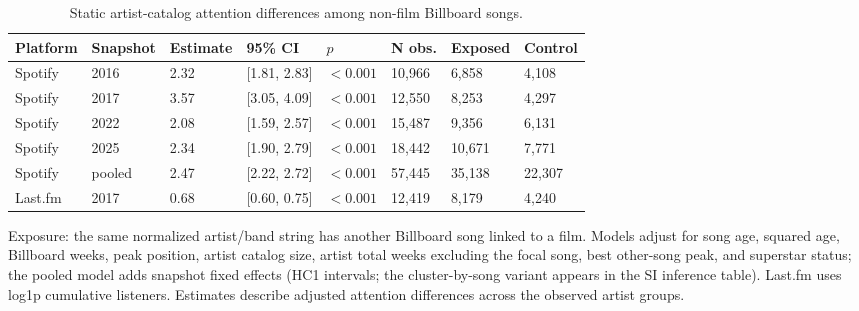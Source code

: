 \begin{table}[!htbp]
\centering
\footnotesize
\caption{Static artist-catalog attention differences among non-film Billboard songs.}
\label{tab:si-catalog-static}
\renewcommand{\arraystretch}{1.05}
\begin{tabular}{llllllll}
\toprule
Platform & Snapshot & Estimate & 95\% CI & $p$ & N obs. & Exposed & Control \\
\midrule
Spotify & 2016 & 2.32 & [1.81, 2.83] & $<0.001$ & 10,966 & 6,858 & 4,108 \\
Spotify & 2017 & 3.57 & [3.05, 4.09] & $<0.001$ & 12,550 & 8,253 & 4,297 \\
Spotify & 2022 & 2.08 & [1.59, 2.57] & $<0.001$ & 15,487 & 9,356 & 6,131 \\
Spotify & 2025 & 2.34 & [1.90, 2.79] & $<0.001$ & 18,442 & 10,671 & 7,771 \\
Spotify & pooled & 2.47 & [2.22, 2.72] & $<0.001$ & 57,445 & 35,138 & 22,307 \\
Last.fm & 2017 & 0.68 & [0.60, 0.75] & $<0.001$ & 12,419 & 8,179 & 4,240 \\
\bottomrule
\end{tabular}
\begin{flushleft}\footnotesize
Exposure: the same normalized artist/band string has another Billboard song linked to a film. Models adjust for song age, squared age, Billboard weeks, peak position, artist catalog size, artist total weeks excluding the focal song, best other-song peak, and superstar status; the pooled model adds snapshot fixed effects (HC1 intervals; the cluster-by-song variant appears in the SI inference table). Last.fm uses log1p cumulative listeners. Estimates describe adjusted attention differences across the observed artist groups.
\end{flushleft}
\end{table}
